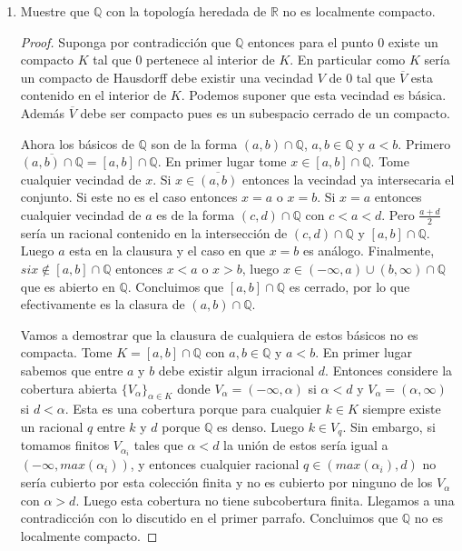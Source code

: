 \documentclass[letter,twoside,12pt]{article}
\begin{document}
\begin{enumerate}
\item Muestre que $ \mathbb{Q} $ con la topología heredada de $ \mathbb{R} $ no es localmente compacto.

\begin{proof}
Suponga por contradicción que $ \mathbb{Q} $ entonces para el punto 0 existe un compacto $ K $ tal que $ 0 $ pertenece al interior de $ K $. En particular como $ K $ sería un compacto de Hausdorff debe existir una vecindad $ V $ de 0 tal que $ \overline{V} $ esta contenido en el interior de $ K $. Podemos suponer que esta vecindad es básica. Además $ \overline{V} $ debe ser compacto pues es un subespacio cerrado de un compacto. 

Ahora los básicos de $ \mathbb{Q} $ son de la forma $ (a,b) \cap \mathbb{Q} $, $ a,b \in \mathbb{Q}$ y $ a < b $. Primero $ \overline{(a,b) \cap \mathbb{Q}} = [a,b] \cap \mathbb{Q} $. En primer lugar tome $ x \in [a,b] \cap \mathbb{Q} $. Tome cualquier vecindad de $ x $. Si $ x \in \overline{(a,b)} $ entonces la vecindad ya intersecaria el conjunto. Si este no es el caso entonces $ x = a $ o  $ x = b $. Si $ x = a $ entonces cualquier vecindad de $ a $ es de la forma $ (c,d) \cap \mathbb{Q} $ con $ c<a<d $. Pero $ \frac{a+d}{2} $ sería un racional contenido en la intersección de  $ (c,d) \cap \mathbb{Q} $ y $ [a,b] \cap \mathbb{Q} $. Luego $ a $ esta en la clausura y el caso en que $ x = b $ es análogo. Finalmente, $ si x \not \in [a,b] \cap \mathbb{Q} $ entonces $ x < a $ o $ x > b $, luego $ x \in (- \infty, a) \cup (b,\infty) \cap \mathbb{Q} $ que es abierto en $ \mathbb{Q} $. Concluimos que $ [a,b] \cap \mathbb{Q} $ es cerrado, por lo que efectivamente es la clasura de $ (a,b) \cap \mathbb{Q} $.

Vamos a demostrar que la clausura de cualquiera de estos básicos no es compacta. Tome $ K = [a,b] \cap \mathbb{Q} $ con $ a, b \in \mathbb{Q} $ y $ a < b $. En primer lugar sabemos que entre $ a $ y $ b $ debe existir algun irracional $ d $. Entonces considere la cobertura abierta $ \{V_\alpha\} _{\alpha \in K } $ donde $ V_\alpha = (-\infty, \alpha) $ si $ \alpha < d $ y $ V_\alpha = (\alpha,\infty) $ si $ d < \alpha $. Esta es una cobertura porque para cualquier $ k \in K $ siempre existe un racional $ q $ entre $ k $ y $ d $ porque $ \mathbb{Q} $ es denso. Luego $ k \in V_q $. Sin embargo, si tomamos finitos $ V_{\alpha_i} $ tales que $ \alpha<d $ la unión de estos sería igual a $ (-\infty,max(\alpha_i)) $, y entonces cualquier racional $ q \in (max(\alpha_i),d) $ no sería cubierto por esta colección finita y no es cubierto por ninguno de los $ V_\alpha $ con $ \alpha > d $. Luego esta cobertura no tiene subcobertura finita. Llegamos a una contradicción con lo discutido en el primer parrafo. Concluimos que $ \mathbb{Q} $ no es localmente compacto.
  

\end{proof}
\end{enumerate}
\end{document}
